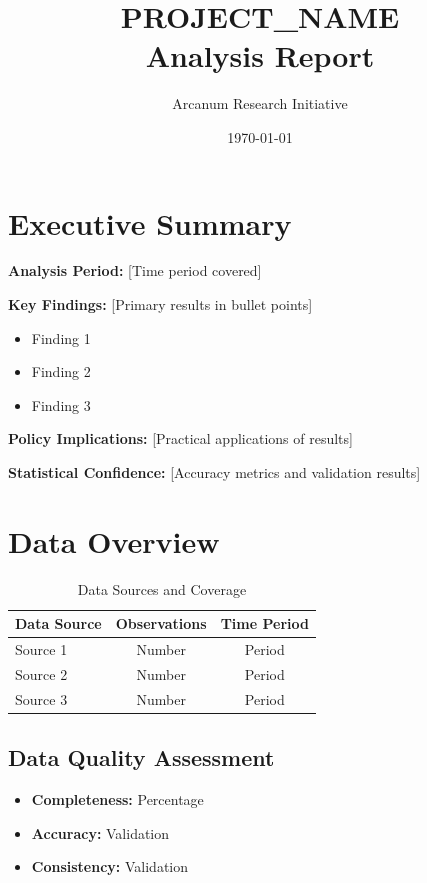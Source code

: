 \documentclass[11pt,letterpaper]{article}
\title{\textbf{PROJECT\_NAME}\\Analysis Report}
\author{Arcanum Research Initiative}
\date{\today}
\begin{document}
\maketitle

\tableofcontents
\newpage

\section{Executive Summary}

\textbf{Analysis Period:} [Time period covered]

\textbf{Key Findings:} [Primary results in bullet points]
\begin{itemize}
    \item Finding 1
    \item Finding 2
    \item Finding 3
\end{itemize}

\textbf{Policy Implications:} [Practical applications of results]

\textbf{Statistical Confidence:} [Accuracy metrics and validation results]

\section{Data Overview}

\begin{table}
\centering
\begin{tabular}{@{}lcc@{}}
\toprule
\textbf{Data Source} & \textbf{Observations} & \textbf{Time Period} \\
\midrule
Source 1 & Number & Period \\
Source 2 & Number & Period \\
Source 3 & Number & Period \\
\bottomrule
\end{tabular}
\caption{Data Sources and Coverage}
\end{table}

\subsection{Data Quality Assessment}
\begin{itemize}
    \item \textbf{Completeness:} Percentage
    \item \textbf{Accuracy:} Validation
    \item \textbf{Consistency:} Validation
\end{itemize}
\end{document}
